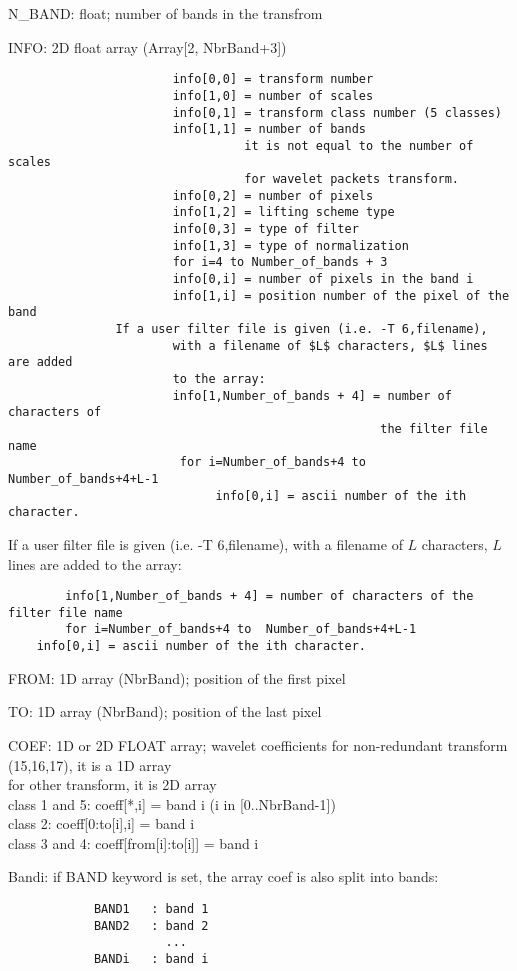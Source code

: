 {\small
\bi
\item N\_BAND: float; number of bands in the transfrom    
\item INFO: 2D float array (Array[2, NbrBand+3])
\begin{verbatim}
                       info[0,0] = transform number
                       info[1,0] = number of scales
                       info[0,1] = transform class number (5 classes)
                       info[1,1] = number of bands
                                 it is not equal to the number of scales
                                 for wavelet packets transform.
                       info[0,2] = number of pixels
                       info[1,2] = lifting scheme type
                       info[0,3] = type of filter
                       info[1,3] = type of normalization
                       for i=4 to Number_of_bands + 3  
                       info[0,i] = number of pixels in the band i
                       info[1,i] = position number of the pixel of the band
		       If a user filter file is given (i.e. -T 6,filename), 
                       with a filename of $L$ characters, $L$ lines are added 
                       to the array:
                       info[1,Number_of_bands + 4] = number of characters of 
                                                    the filter file name
                        for i=Number_of_bands+4 to  Number_of_bands+4+L-1
                             info[0,i] = ascii number of the ith character.
\end{verbatim}
If a user filter file is given (i.e. -T 6,filename), with a filename 
of $L$ characters, $L$ lines are added to the array:
\begin{verbatim}
        info[1,Number_of_bands + 4] = number of characters of the filter file name
        for i=Number_of_bands+4 to  Number_of_bands+4+L-1
	info[0,i] = ascii number of the ith character.
\end{verbatim}
\item FROM: 1D array (NbrBand); position of the first pixel 
\item TO: 1D array (NbrBand); position of the last pixel
\item COEF: 1D or 2D FLOAT array; wavelet coefficients
     for non-redundant transform (15,16,17), it is a 1D array \\
     for other transform, it is 2D array \\
     class 1 and 5: coeff[*,i] = band i (i in [0..NbrBand-1]) \\
     class 2: coeff[0:to[i],i] = band i \\
     class 3 and 4: coeff[from[i]:to[i]] = band i \\
\item Bandi: if BAND keyword is set, the array coef is also split 
into bands:
\begin{verbatim}
            BAND1   : band 1  
            BAND2   : band 2  
                      ...
            BANDi   : band i  
\end{verbatim}
\ei
}

